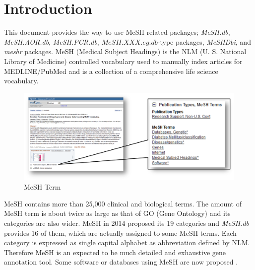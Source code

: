 \documentclass[11pt]{article}
\newcommand{\Rpackage}[1]{{\textit{#1}}}
\begin{document}
\section{Introduction}
This document provides the way to use MeSH-related packages; \Rpackage{MeSH.db}, \Rpackage{MeSH.AOR.db}, \Rpackage{MeSH.PCR.db}, $MeSH.XXX.eg.db$-type packages, \Rpackage{MeSHDbi}, and \Rpackage{meshr} packages. MeSH (Medical Subject Headings) is the NLM (U. S. National Library of Medicine) controlled vocabulary used to manually index articles for MEDLINE/PubMed \cite{Nelson2004} and is a collection of a comprehensive life science vocabulary.
\begin{figure}[ht]
\centering
\includegraphics[width=\linewidth]{fig1.png}
\caption{MeSH Term}
\label{fig1}
\end{figure}
MeSH contains more than 25,000 clinical and biological terms. The amount of MeSH term is about twice as large as that of GO (Gene Ontology)\cite{Ashburner2000} and its categories are also wider. MeSH in 2014 proposed its 19 categories and \Rpackage{MeSH.db} provides 16 of them, which are actually assigned to some MeSH terms. Each category is expressed as single capital alphabet as abbreviation defined by NLM. Therefore MeSH is an expected to be much detailed and exhaustive gene annotation tool. Some software or databases using MeSH are now proposed \cite{Nakazato2007, Nakazato2009, Saurin2010, Sartor2012}.
\end{document}

